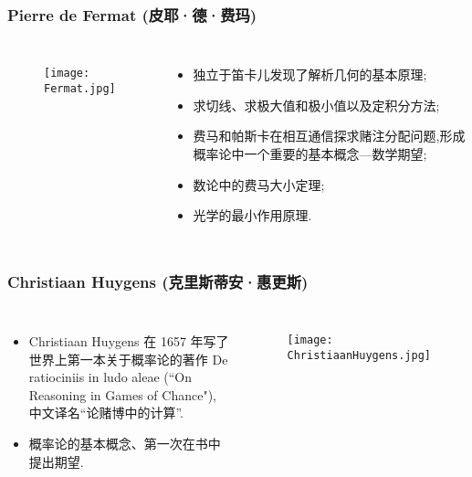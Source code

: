 \begin{frame}
  \frametitle{{\rm Pierre de Fermat} (皮耶·德·费玛)}
  \begin{columns}
    \column{4cm}
    \begin{figure}[htbp]\nonumber

      \centering
      \texttt{[image: Fermat.jpg]}

    \end{figure}
    \column{6.5cm}
    \begin{itemize}[<+-|alert@+>]
    \item 独立于笛卡儿发现了解析几何的基本原理;
    \item 求切线、求极大值和极小值以及定积分方法;
    \item 费马和帕斯卡在相互通信探求赌注分配问题,形成概率论中一个重要的基本概念—数学期望;
    \item 数论中的费马大小定理;
    \item 光学的最小作用原理.
    \end{itemize}
  \end{columns}
\end{frame}


\begin{frame}
  \frametitle{{\rm Christiaan Huygens }(克里斯蒂安·惠更斯)}
  \begin{columns}
    \column{6cm}
    \begin{itemize}[<+-|alert@+>]
    \item {\rm Christiaan Huygens} 在 1657 年写了世界上第一本关于概率论的著作 {\rm De ratiociniis in ludo aleae (``On Reasoning in Games of Chance")}, 中文译名``论赌博中的计算”.
    \item 概率论的基本概念、第一次在书中提出期望.
    \end{itemize}

    \column{4cm}
    \begin{figure}[htbp]
      \centering
      \texttt{[image: ChristiaanHuygens.jpg]}
    \end{figure}
  \end{columns}
\end{frame}

